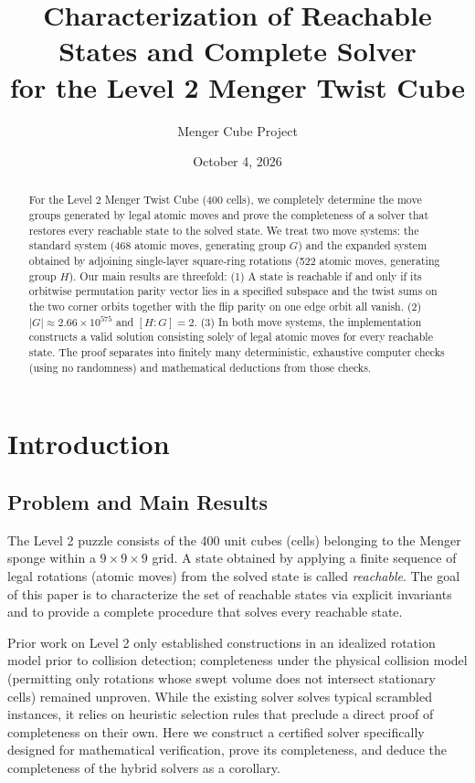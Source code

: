 \documentclass[a4paper,11pt]{article}
\title{Characterization of Reachable States and Complete Solver\\for the Level 2 Menger Twist Cube}
\author{Menger Cube Project}
\date{October 4, 2026}
\begin{document}
\maketitle

\begin{abstract}
For the Level 2 Menger Twist Cube (400 cells), we completely determine the move groups generated by legal atomic moves and prove the completeness of a solver that restores every reachable state to the solved state.
We treat two move systems: the standard system (468 atomic moves, generating group $G$) and the expanded system obtained by adjoining single-layer square-ring rotations (522 atomic moves, generating group $H$).
Our main results are threefold:
(1) A state is reachable if and only if its orbitwise permutation parity vector lies in a specified subspace and the twist sums on the two corner orbits together with the flip parity on one edge orbit all vanish.
(2) $|G|\approx 2.66\times10^{575}$ and $[H:G]=2$.
(3) In both move systems, the implementation  constructs a valid solution consisting solely of legal atomic moves for every reachable state.
The proof separates into finitely many deterministic, exhaustive computer checks (using no randomness) and mathematical deductions from those checks.
\end{abstract}

\tableofcontents

\section{Introduction}

\subsection{Problem and Main Results}

The Level 2 puzzle consists of the 400 unit cubes (cells) belonging to the Menger sponge within a $9\times9\times9$ grid.
A state obtained by applying a finite sequence of legal rotations (atomic moves) from the solved state is called \emph{reachable}.
The goal of this paper is to characterize the set of reachable states via explicit invariants and to provide a complete procedure that solves every reachable state.

Prior work on Level 2 only established constructions in an idealized rotation model prior to collision detection; completeness under the physical collision model (permitting only rotations whose swept volume does not intersect stationary cells) remained unproven.
While the existing solver  solves typical scrambled instances, it relies on heuristic selection rules that preclude a direct proof of completeness on their own.
Here we construct a certified solver specifically designed for mathematical verification, prove its completeness, and deduce the completeness of the hybrid solvers as a corollary.
\end{document}
